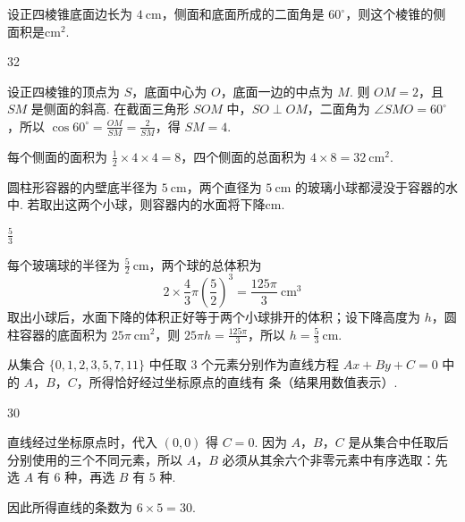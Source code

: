 \documentclass[UTF8,a4paper,oneside,11pt]{ctexbook}
\begin{document}
\begin{problem}[A]
设正四棱锥底面边长为 \(4\mathrm{~cm}\)，侧面和底面所成的二面角是 \(60^\circ\)，则这个棱锥的侧面积是\fillinblank{}\(\mathrm{cm}^2\).
\end{problem}

\begin{answer}
32
\end{answer}

\begin{solution}
设正四棱锥的顶点为 \(S\)，底面中心为 \(O\)，底面一边的中点为 \(M\). 则 \(OM=2\)，且 \(SM\) 是侧面的斜高. 在截面三角形 \(SOM\) 中，\(SO\perp OM\)，二面角为 \(\angle SMO=60^\circ\)，所以
\(\cos60^\circ=\frac{OM}{SM}=\frac{2}{SM}\)，得 \(SM=4\).

每个侧面的面积为 \(\frac12\times4\times4=8\)，四个侧面的总面积为 \(4\times8=32\ \mathrm{cm}^2\).
\end{solution}

\begin{problem}[A]
圆柱形容器的内壁底半径为 \(5\mathrm{~cm}\)，两个直径为 \(5\mathrm{~cm}\) 的玻璃小球都浸没于容器的水中. 若取出这两个小球，则容器内的水面将下降\fillinblank{}\(\mathrm{cm}\).
\end{problem}

\begin{answer}
\(\frac{5}{3}\)
\end{answer}

\begin{solution}
每个玻璃球的半径为 \(\frac52\ \mathrm{cm}\)，两个球的总体积为
\[
2\times\frac43\pi\left(\frac52\right)^3=\frac{125\pi}{3}\ \mathrm{cm}^3
\]
取出小球后，水面下降的体积正好等于两个小球排开的体积；设下降高度为 \(h\)，圆柱容器的底面积为 \(25\pi\ \mathrm{cm}^2\)，则
\(25\pi h=\frac{125\pi}{3}\)，所以 \(h=\frac53\ \mathrm{cm}\).
\end{solution}

\begin{problem}[A]
从集合 \(\{0,1,2,3,5,7,11\}\) 中任取 \(3\) 个元素分别作为直线方程 \(Ax+By+C=0\) 中的 \(A\)，\(B\)，\(C\)，所得恰好经过坐标原点的直线有\fillinblank{} 条（结果用数值表示）.
\end{problem}

\begin{answer}
30
\end{answer}

\begin{solution}
直线经过坐标原点时，代入 \((0,0)\) 得 \(C=0\). 因为 \(A\)，\(B\)，\(C\) 是从集合中任取后分别使用的三个不同元素，所以 \(A\)，\(B\) 必须从其余六个非零元素中有序选取：先选 \(A\) 有 \(6\) 种，再选 \(B\) 有 \(5\) 种.

因此所得直线的条数为 \(6\times5=30\).
\end{solution}
\end{document}

